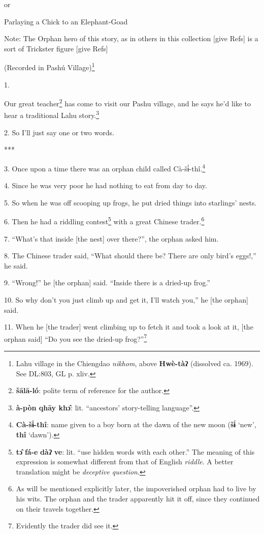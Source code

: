 \setcounter{footnote}{0}

or

Parlaying a Chick to an Elephant-Goad

Note: The Orphan hero of this story, as in others in this collection [give Refs]
is a sort of Trickster figure [give Refs]

(Recorded in Pashú Village)\footnote{Lahu village in the Chiengdao \textit{nikhom}, above \textbf{Hwè-tàʔ} (dissolved ca. 1969). See DL:803, GL p. xliv.}

1. 

Our great teacher\footnote{\textbf{šālā-ló}: polite term of reference for the author.} has come to visit our Pashu village, and he says he'd like
to hear a traditional Lahu story.\footnote{\textbf{à-pòn qhāy khɔ̂}: lit. ``ancestors' story-telling language''.}

2. So I'll just say one or two words.

***

3. Once upon a time there was an orphan child called Cà-šɨ́-thî.\footnote{\textbf{Cà-šɨ́-thî}: name given to a boy born at the dawn of the new moon (\textbf{šɨ́} `new', \textbf{thî} `dawn').}

4. Since he was very poor he had nothing to eat from day to day.

5. So when he was off scooping up frogs, he put dried things into starlings' nests.

6. Then he had a riddling contest\footnote{\textbf{tɔ̂} \textbf{fá-e} \textbf{dàʔ} \textbf{ve}: lit. ``use hidden words with each other.'' The meaning of this expression is somewhat different from that of English \textit{riddle}. A better translation might be \textit{deceptive question}.} with a great Chinese trader.\footnote{As will be mentioned explicitly later, the impoverished orphan had to live by his wits. The orphan and the trader apparently hit it off, since they continued on their travels together.}

7. ``What's that inside [the nest] over there?'', the orphan asked him.

8. The Chinese trader said, ``What should there be? There are only bird's eggs!,''
he said.

9. ``Wrong!'' he [the orphan] said. ``Inside there is a dried-up frog.''

10. So why don't you just climb up and get it, I'll watch you,'' he [the orphan]
said.

11. When he [the trader] went climbing up to fetch it and took a look at it, [the
orphan said] ``Do you see the dried-up frog?''\footnote{Evidently the trader did see it.}

